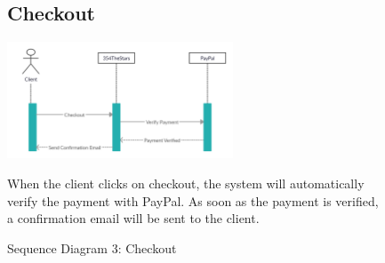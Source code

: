 \documentclass[11pt]{article}
\begin{document}
\begin{figure}[ht!]
    \subsection{Checkout}
    \centering
    \includegraphics[width=0.6\textwidth,height=0.15\paperheight]{Diagrams/Sequence/Checkout.jpg} 
    \caption{Sequence Diagram 3: Checkout}
    \label{fig: Checkout}
    \begin{flushleft}
        When the client clicks on checkout, the system will automatically verify the payment with PayPal. As soon as the payment is verified, a confirmation email will be sent to the client.
    \end{flushleft}
\end{figure}
\end{document}
